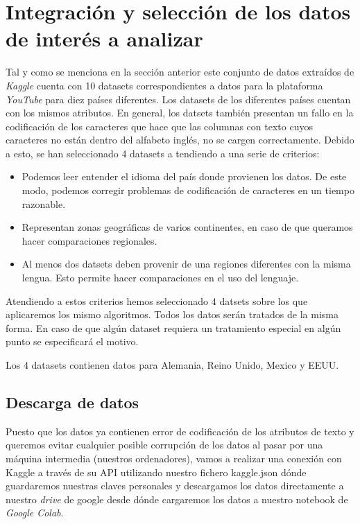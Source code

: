 \documentclass[a4paper,12pt]{article}
\begin{document}
\section{Integraci\'on y selecci\'on de los datos de inter\'es a analizar}

Tal y como se menciona en la secci\'on anterior este conjunto de datos extra\'idos de {\itshape Kaggle} cuenta con 10 datasets correspondientes a datos para la plataforma {\itshape YouTube} para diez pa\'ises diferentes. Los datasets de los diferentes pa\'ises cuentan con los mismos atributos. En general, los datsets tambi\'en presentan un fallo en la codificaci\'on de los caracteres que hace que las columnas con texto cuyos caracteres no est\'an dentro del alfabeto ingl\'es, no se cargen correctamente. Debido a esto, se han seleccionado 4 datasets a tendiendo a una serie de criterios:

\begin{itemize}

\item Podemos leer entender el idioma del pa\'is donde provienen los datos. De este modo, podemos corregir problemas de codificaci\'on de caracteres en un tiempo razonable.
\item Representan zonas geogr\'aficas de varios continentes, en caso de que queramos hacer comparaciones regionales. 
\item Al menos dos datsets deben provenir de una regiones diferentes con la misma lengua. Esto permite hacer comparaciones en el uso del lenguaje.



\end{itemize} 

Atendiendo a estos criterios hemos seleccionado 4 datsets sobre  los que aplicaremos los mismo algoritmos. Todos los datos ser\'an tratados de la misma forma. En caso de que alg\'un dataset requiera un tratamiento especial en alg\'un punto se especificar\'a el motivo.

Los 4 datasets contienen datos para Alemania, Reino Unido, Mexico y EEUU.

\subsection{Descarga de datos}

Puesto que los datos ya contienen error de codificaci\'on de los atributos de texto y queremos evitar cualquier posible corrupci\'on de los datos al pasar por una m\'aquina intermedia (nuestros ordenadores), vamos a realizar una conexi\'on con Kaggle a trav\'es de su API utilizando nuestro fichero kaggle.json d\'onde guardaremos nuestras claves personales y descargamos los datos directamente a nuestro {\itshape drive} de google desde d\'onde cargaremos los datos a nuestro notebook de {\itshape Google Colab}. 
\end{document}
